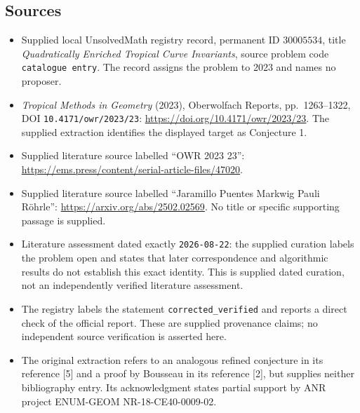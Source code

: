 \documentclass[11pt]{article}
\begin{document}
\subsection{Sources}
\begin{itemize}
\item Supplied local UnsolvedMath registry record, permanent ID \(30005534\), title \emph{Quadratically Enriched Tropical Curve Invariants}, source problem code \texttt{catalogue entry}. The record assigns the problem to 2023 and names no proposer.
\item \emph{Tropical Methods in Geometry} (2023), Oberwolfach Reports, pp.\ 1263--1322, DOI \texttt{10.4171/owr/2023/23}: \url{https://doi.org/10.4171/owr/2023/23}. The supplied extraction identifies the displayed target as Conjecture 1.
\item Supplied literature source labelled ``OWR 2023 23'': \url{https://ems.press/content/serial-article-files/47020}.
\item Supplied literature source labelled ``Jaramillo Puentes Markwig Pauli R\"ohrle'': \url{https://arxiv.org/abs/2502.02569}. No title or specific supporting passage is supplied.
\item Literature assessment dated exactly \texttt{2026-08-22}: the supplied curation labels the problem open and states that later correspondence and algorithmic results do not establish this exact identity. This is supplied dated curation, not an independently verified literature assessment.
\item The registry labels the statement \texttt{corrected\_verified} and reports a direct check of the official report. These are supplied provenance claims; no independent source verification is asserted here.
\item The original extraction refers to an analogous refined conjecture in its reference [5] and a proof by Bousseau in its reference [2], but supplies neither bibliography entry. Its acknowledgment states partial support by ANR project ENUM-GEOM NR-18-CE40-0009-02.
\end{itemize}
\end{document}

